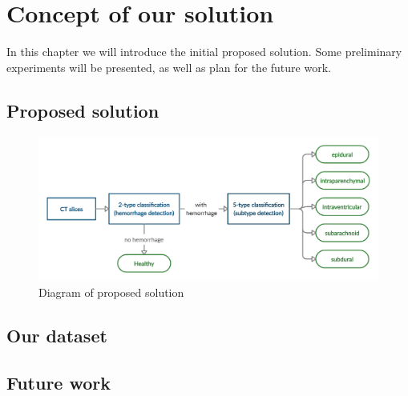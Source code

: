 \chapter{Concept of our solution} %
In this chapter we will introduce the initial proposed solution. Some preliminary experiments will be presented, as well as plan for the future work.
\section{Proposed solution}

\begin{figure}[!ht]
\begin{centering}
\includegraphics[width=16cm]{assets/images/mySolution.png}
\par\end{centering}
\caption{Diagram of proposed solution \label{fig:solution}}
\end{figure}

\section{Our dataset}
\section{Future work}
